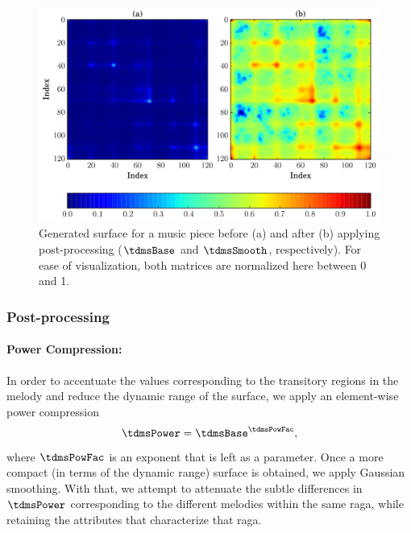 \begin{figure}
	\begin{center}
		\includegraphics[width=\figSizeHundred]{ch07_ragaRecognition/figures/PSfeature_e59642ca-72bc-466b-bf4b-d82bfbc7b4af.pdf}
	\end{center}
	\caption{Generated surface for a music piece before (a) and after (b) applying post-processing ($\tdmsBase$ and $\tdmsSmooth$, respectively). For ease of visualization, both matrices are normalized here between 0 and 1.}
	\label{fig:phase_space_surface}
\end{figure}

\subsubsection{Post-processing}
\label{sec:tdms_post_processing}

\paragraph{Power Compression:} In order to accentuate the values corresponding to the transitory regions in the melody and reduce the dynamic range of the surface, we apply an element-wise power compression
\begin{equation}
\label{eq:tdms_power_compression}	
\tdmsPower= \tdmsBase^\tdmsPowFac ,
\end{equation}
where $\tdmsPowFac$ is an exponent that is left as a parameter. Once a more compact (in terms of the dynamic range) surface is obtained, we apply Gaussian smoothing. With that, we attempt to attenuate the subtle differences in $\tdmsPower$ corresponding to the different melodies within the same \gls{raga}, while retaining the attributes that characterize that \gls{raga}. 

